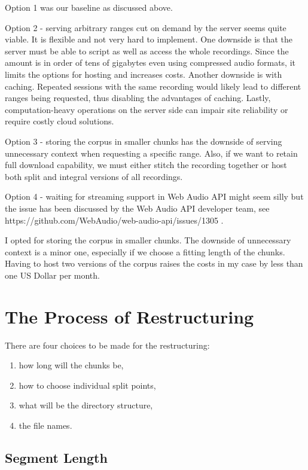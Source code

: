 \documentclass{llncs}
\begin{document}
Option 1 was our baseline as discussed above.

Option 2 - serving arbitrary ranges cut on demand by the server seems quite
viable. It is flexible and not very hard to implement. One downside is that the
server must be able to script as well as access the whole recordings. Since the
amount is in order of tens of gigabytes even using compressed audio formats, it
limits the options for hosting and increases costs. Another downside is with
caching. Repeated sessions with the same recording would likely lead to
different ranges being requested, thus disabling the advantages of caching.
Lastly, computation-heavy operations on the server side can impair site
reliability or require costly cloud solutions.

Option 3 - storing the corpus in smaller chunks has the downside of serving unnecessary context when requesting a specific range. Also, if we want to retain full download capability, we must either stitch the recording together or host both split and integral versions of all recordings. 

Option 4 - waiting for streaming support in Web Audio API might seem silly but the issue has been discussed by the Web Audio API developer team, see https://github.com/WebAudio/web-audio-api/issues/1305 .

I opted for storing the corpus in smaller chunks. The downside of unnecessary context is a minor one, especially if we choose a fitting length of the chunks. Having to host two versions of the corpus raises the costs in my case by less than one US Dollar per month.

\section{The Process of Restructuring}

There are four choices to be made for the restructuring: 
\begin{enumerate}
    \item{how long will the chunks be,}
    \item{how to choose individual split points,}
    \item{what will be the directory structure,}
    \item{the file names.}
\end{enumerate}

\subsection{Segment Length}
\end{document}
